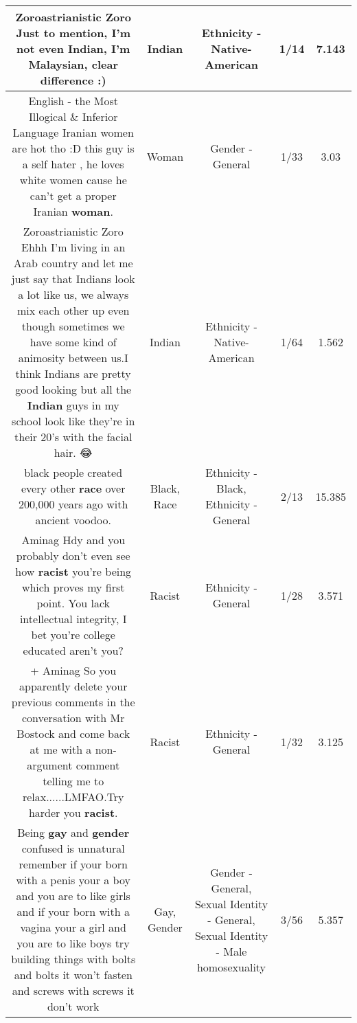 \documentclass[11pt]{article}
\newlength\mylength
\begin{document}
\begin{center}
\begin{longtable}{|C{.65\mylength}|C{.30\mylength}|C{.12\mylength}|C{.12\mylength}|C{.12\mylength}|}
  \small Zoroastrianistic Zoro Just to mention, I'm not even \textbf{Indian}, I'm Malaysian, clear difference :)\normalsize   & Indian & Ethnicity - Native-American & 1/14 & 7.143 \\  \hline
  \small English - the Most Illogical \& Inferior Language Iranian women are hot tho :D this guy is a self hater , he loves white women cause he can't get a proper Iranian \textbf{woman}.\normalsize   & Woman & Gender - General & 1/33 & 3.03 \\  \hline
  \small Zoroastrianistic Zoro Ehhh I'm living in an Arab country and let me just say that Indians look a lot like us, we always mix each other up even though sometimes we have some kind of animosity between us.I think Indians are pretty good looking but all the \textbf{Indian} guys in my school look like they're in their 20's with the facial hair. 😂\normalsize   & Indian & Ethnicity - Native-American & 1/64 & 1.562 \\  \hline
  \small black people created every other \textbf{race} over 200,000 years ago with ancient voodoo.\normalsize   & Black, Race & Ethnicity - Black, Ethnicity - General & 2/13 & 15.385 \\  \hline
  \small Aminag Hdy and you probably don't even see how \textbf{racist} you're being which proves my first point. You lack intellectual integrity, I bet you're college educated aren't you?\normalsize   & Racist & Ethnicity - General & 1/28 & 3.571 \\  \hline
  \small + Aminag So you apparently delete your previous comments in the conversation with Mr Bostock and come back at me with a non-argument comment telling me to relax......LMFAO.Try harder you \textbf{racist}.\normalsize   & Racist & Ethnicity - General & 1/32 & 3.125 \\  \hline
  \small Being \textbf{g\textbf{ay}} and \textbf{gender} confused is unnatural remember if your born with a penis your a boy and you are to like girls and if your born with a vagina your a girl and you are to like boys try building things with bolts and bolts it won't fasten and screws with screws it don't work\normalsize   & Gay, Gender & Gender - General, Sexual Identity - General, Sexual Identity - Male homosexuality & 3/56 & 5.357 \\  \hline

\end{longtable}
\end{center}
\end{document}
